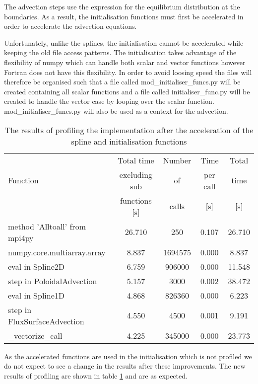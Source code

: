 The advection steps use the expression for the equilibrium distribution at the boundaries. As a result, the initialisation functions must first be accelerated in order to accelerate the advection equations.

Unfortunately, unlike the splines, the initialisation cannot be accelerated while keeping the old file access patterns. The initialisation takes advantage of the flexibility of numpy which can handle both scalar and vector functions however Fortran does not have this flexibility. In order to avoid loosing speed the files will therefore be organised such that a file called mod\_initialiser\_funcs.py will be created containing all scalar functions and a file called initialiser\_func.py will be created to handle the vector case by looping over the scalar function. mod\_initialiser\_funcs.py will also be used as a context for the advection.

\begin{table}[ht]
\centering
 \begin{tabular}{|m{}|c|c|c|c|}
  \hline
          & Total time & Number & Time & Total \\
  Function & excluding sub & of & per call & time \\
          & functions [s] & calls & [s] & [s] \\
  \hline
  \hline
  method 'Alltoall' from mpi4py & 26.710 & 250 & 0.107 & 26.710 \\
  \hline
  numpy.core.multiarray.array & 8.837 & 1694575 & 0.000 & 8.837 \\
  \hline
  eval in Spline2D & 6.759 & 906000 & 0.000 & 11.548\\
  \hline
  step in PoloidalAdvection & 5.157 & 3000 & 0.002 & 38.472\\
  \hline
  eval in Spline1D & 4.868 & 826360 & 0.000 & 6.223\\
  \hline
  step in FluxSurfaceAdvection & 4.550 & 4500 & 0.001 & 9.191\\
  \hline
  \_vectorize\_call & 4.225 & 345000 & 0.000 & 23.773\\
  \hline
 \end{tabular}
 \caption{\label{tab::init profile} The results of profiling the implementation after the acceleration of the spline and initialisation functions}
\end{table}

As the accelerated functions are used in the initialisation which is not profiled we do not expect to see a change in the results after these improvements. The new results of profiling are shown in table \ref{tab::init profile} and are as expected.

